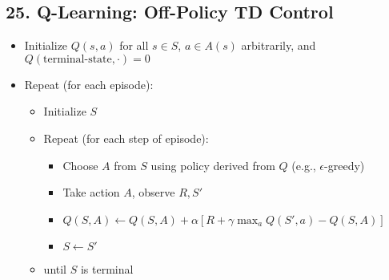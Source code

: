 \documentclass[letterpaper,10pt]{article}
\begin{document}
\begin{multicols}{2}
\section*{25. Q-Learning: Off-Policy TD Control}
\begin{itemize}
    \item Initialize \( Q(s,a) \) for all \( s \in S \), \( a \in A(s) \) arbitrarily, and \( Q(\text{terminal-state}, \cdot) = 0 \)
    \item Repeat (for each episode):
    \begin{itemize}
        \item Initialize \( S \)
        \item Repeat (for each step of episode):
        \begin{itemize}
            \item Choose \( A \) from \( S \) using policy derived from \( Q \) (e.g., \(\epsilon\)-greedy)
            \item Take action \( A \), observe \( R, S' \)
            \item \( Q(S,A) \leftarrow Q(S,A) + \alpha [R + \gamma \max_{a} Q(S', a) - Q(S,A)] \)
            \item \( S \leftarrow S' \)
        \end{itemize}
        \item until \( S \) is terminal
    \end{itemize}
\end{itemize}


\end{multicols}
\end{document}
